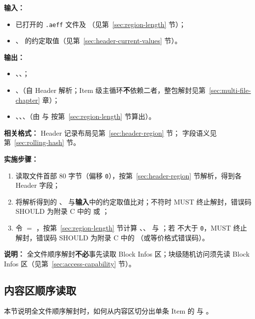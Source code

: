 \textbf{输入：}
\begin{itemize}
  \item 已打开的 \texttt{.aeff} 文件及 （见第~\ref{sec:region-length} 节）；
  \item {}、 的约定取值（见第~\ref{sec:header-current-values} 节）。
\end{itemize}

\textbf{输出：}
\begin{itemize}
  \item {}、、；
  \item {}、（自 Header 解析；Item 级主循环\textbf{不}依赖二者，整包解封见第~\ref{sec:multi-file-chapter} 章）；
  \item {}、、、（由  与  按第~\ref{sec:region-length} 节算出）。
\end{itemize}

\textbf{相关格式：}
Header 记录布局见第~\ref{sec:header-region} 节； 字段语义见第~\ref{sec:rolling-hash} 节。

\textbf{实施步骤：}
\begin{enumerate}
  \item 读取文件首部 80 字节（偏移 \texttt{0}），按第~\ref{sec:header-region} 节解析，得到各 Header 字段；
  \item 将解析得到的 、 与\textbf{输入}中的约定取值比对；不符时 MUST 终止解封，错误码 SHOULD 为附录 C 中的  或 ；
  \item 令  $=$ ，按第~\ref{sec:region-length} 节计算 、、 与 ；若  不大于 \texttt{0}，MUST 终止解封，错误码 SHOULD 为附录 C 中的 （或等价格式错误码）。
\end{enumerate}

\textbf{说明：}
全文件顺序解封\textbf{不必}事先读取 Block Infos 区；块级随机访问须先读 Block Infos 区（见第~\ref{sec:access-capability} 节）。

\subsection{内容区顺序读取}\label{sec:unseal-item-parse}
本节说明全文件顺序解封时，如何从内容区切分出单条 Item 的  与 。

